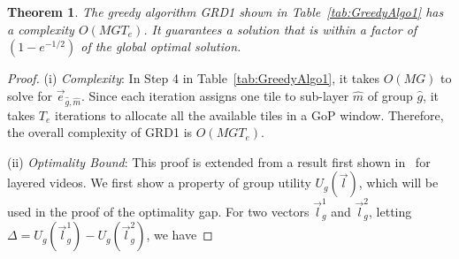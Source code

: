 \documentclass[12pt,onecolumn,draftclsnofoot]{IEEEtran} %
\newtheorem{theorem}{Theorem}
\begin{document}
\smallskip
\begin{theorem} 
The greedy algorithm GRD1 shown in Table~\ref{tab:GreedyAlgo1} has a complexity $O(M G T_e)$.  It guarantees a solution that is within a factor of $(1-e^{-1/2})$ of the global optimal solution. 
\end{theorem}

\begin{proof}
(i) {\em Complexity}: In Step 4 in Table~\ref{tab:GreedyAlgo1}, it takes $O(MG)$ to solve for $\vec{e}_{\hat{g},\hat{m}}$. Since each iteration assigns one tile to sub-layer $\hat{m}$ of group $\hat{g}$, it takes $T_e$ iterations to allocate all the available tiles in a GoP window. Therefore, the overall complexity of GRD1 is $O(MGT_e)$.

(ii) {\em Optimality Bound}: This proof is extended from a result first shown in~\cite{Deb08} for layered videos. We first show a property of group utility $U_g(\vec{l})$, which will be used in the proof of the optimality gap.  For two vectors $\vec{l}^1_g$ and $\vec{l}^2_g$, letting $\Delta = U_g(\vec{l}^1_g)-U_g(\vec{l}^2_g)$, we have

\end{proof}
\end{document}
